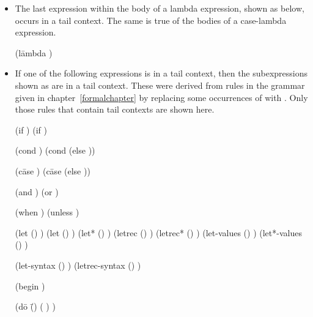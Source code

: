 \begin{itemize}
\item The last expression within the body of a lambda expression,
  shown as  below, occurs in a tail context.
  The same is true of the bodies of a {\cf case-lambda} expression.
\begin{grammar}%
(l\=ambda 
  \>  )
\end{grammar}%

\item If one of the following expressions is in a tail context,
then the subexpressions shown as  are in a tail context.
These were derived from rules in the grammar given in
chapter~\ref{formalchapter} by replacing some occurrences of 
with .  Only those rules that contain tail contexts
are shown here.

\begin{grammar}%
(if   )
(if  )

(cond )
(cond  (else ))

(c\=ase 
  \>)
(c\=ase 
  \>
  \>(else ))

(and  )
(or  )

(when  )
(unless  )

(let () )
(let  () )
(let* () )
(letrec () )
(letrec* () )
(let-values () )
(let*-values () )

(let-syntax () )
(letrec-syntax () )

(begin )

(d\=o \=()
  \>  \>( )
  \>)


\end{grammar}
\end{itemize}
